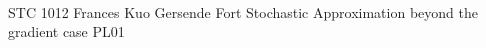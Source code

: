 	\\\hline
	{STC 1012}	%
	{Frances Kuo}		%
	{Gersende Fort}	%
	{Stochastic Approximation beyond the gradient case}		%
	{PL01}			%
	\\\hline
